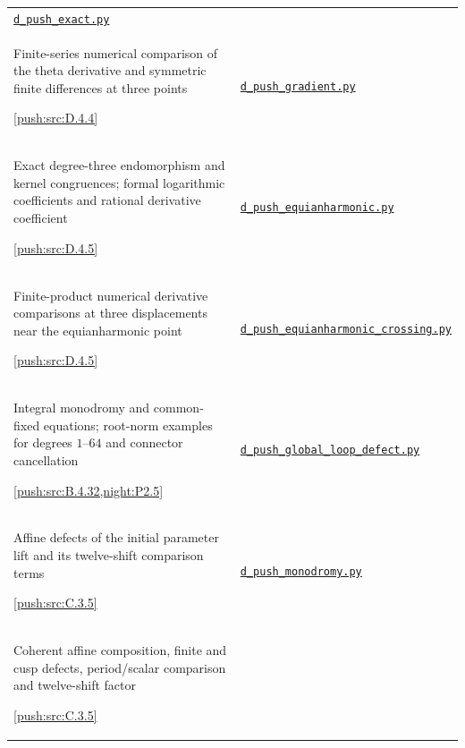 {\begin{longtable}{@{}>{\raggedright\arraybackslash}p{}>{\raggedright\arraybackslash}p{}@{}}
\href{https://raw.githubusercontent.com/KokunoYumeto/s6-complex-structure-workbench/\SsixRepositoryCommit/pro_returns/S6_02_PUSH_final_20261115T2217Z/S6_02_PUSH/code/d_push_exact.py}{\nolinkurl{d_push_exact.py}} \\[3pt]
Finite-series numerical comparison of the theta derivative and symmetric finite differences at three points\par \cref{push:src:D.4.4} &
\href{https://raw.githubusercontent.com/KokunoYumeto/s6-complex-structure-workbench/\SsixRepositoryCommit/pro_returns/S6_02_PUSH_final_20261115T2217Z/S6_02_PUSH/code/d_push_gradient.py}{\nolinkurl{d_push_gradient.py}} \\[3pt]
Exact degree-three endomorphism and kernel congruences; formal logarithmic coefficients and rational derivative coefficient\par \cref{push:src:D.4.5} &
\href{https://raw.githubusercontent.com/KokunoYumeto/s6-complex-structure-workbench/\SsixRepositoryCommit/pro_returns/S6_02_PUSH_final_20261115T2217Z/S6_02_PUSH/code/d_push_equianharmonic.py}{\nolinkurl{d_push_equianharmonic.py}} \\[3pt]
Finite-product numerical derivative comparisons at three displacements near the equianharmonic point\par \cref{push:src:D.4.5} &
\href{https://raw.githubusercontent.com/KokunoYumeto/s6-complex-structure-workbench/\SsixRepositoryCommit/pro_returns/S6_02_PUSH_final_20261115T2217Z/S6_02_PUSH/code/d_push_equianharmonic_crossing.py}{\nolinkurl{d_push_equianharmonic_crossing.py}} \\[3pt]
Integral monodromy and common-fixed equations; root-norm examples for degrees $1$--$64$ and connector cancellation\par \cref{push:src:B.4.32,night:P2.5} &
\href{https://raw.githubusercontent.com/KokunoYumeto/s6-complex-structure-workbench/\SsixRepositoryCommit/pro_returns/S6_02_PUSH_final_20261115T2217Z/S6_02_PUSH/code/d_push_global_loop_defect.py}{\nolinkurl{d_push_global_loop_defect.py}} \\[3pt]
Affine defects of the initial parameter lift and its twelve-shift comparison terms\par \cref{push:src:C.3.5} &
\href{https://raw.githubusercontent.com/KokunoYumeto/s6-complex-structure-workbench/\SsixRepositoryCommit/pro_returns/S6_02_PUSH_final_20261115T2217Z/S6_02_PUSH/code/d_push_monodromy.py}{\nolinkurl{d_push_monodromy.py}} \\[3pt]
Coherent affine composition, finite and cusp defects, period/scalar comparison and twelve-shift factor\par \cref{push:src:C.3.5} &

\end{longtable}}
